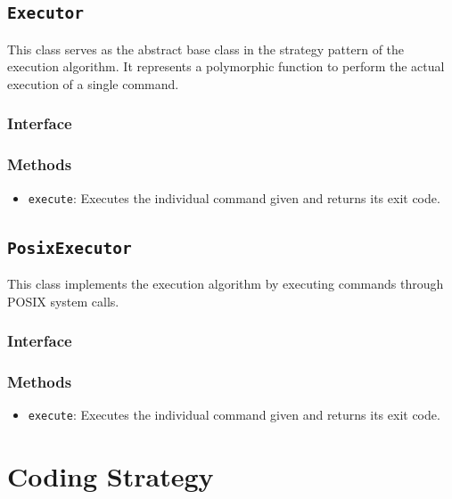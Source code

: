 \documentclass{article}
\begin{document}
  \subsection{\texttt{Executor}}

  This class serves as the abstract base class in the strategy pattern
  of the execution algorithm.  It represents a polymorphic function to
  perform the actual execution of a single command.

  \subsubsection{Interface}
  

  \subsubsection{Methods}
  \begin{itemize}
    \item \texttt{execute}: Executes the individual command given and
      returns its exit code.
  \end{itemize}

  \subsection{\texttt{PosixExecutor}}

  This class implements the execution algorithm by executing commands
  through POSIX system calls.

  \subsubsection{Interface}
  

  \subsubsection{Methods}
  \begin{itemize}
    \item \texttt{execute}: Executes the individual command given and
      returns its exit code.
  \end{itemize}

  \section{Coding Strategy}
\end{document}
